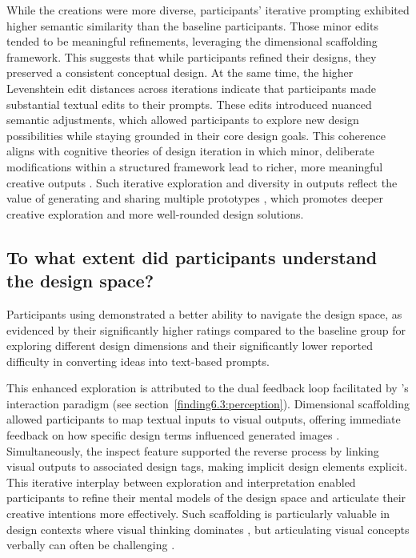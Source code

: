 While the \toolname{} creations were more diverse, participants’ iterative prompting exhibited higher semantic similarity than the baseline participants. Those minor edits tended to be meaningful refinements, leveraging the dimensional scaffolding framework. This suggests that while participants refined their designs, they preserved a consistent conceptual design. At the same time, the higher Levenshtein edit distances across iterations indicate that participants made substantial textual edits to their prompts. These edits introduced nuanced semantic adjustments, which allowed participants to explore new design possibilities while staying grounded in their core design goals. This coherence aligns with cognitive theories of design iteration in which minor, deliberate modifications within a structured framework lead to richer, more meaningful creative outputs \cite{karimi2019relating, davis2024fashioning}. Such iterative exploration and diversity in outputs reflect the value of generating and sharing multiple prototypes \cite{dow2011prototyping, hartmann2008design, kim2022mixplorer}, which promotes deeper creative exploration and more well-rounded design solutions.


\subsection{To what extent did \toolname{} participants understand the design space?}

Participants using \toolname{} demonstrated a better ability to navigate the design space, as evidenced by their significantly higher ratings compared to the baseline group for exploring different design dimensions and their significantly lower reported difficulty in converting ideas into text-based prompts.

This enhanced exploration is attributed to the dual feedback loop facilitated by \toolname{} ’s interaction paradigm (see section~\ref{finding6.3:perception}). Dimensional scaffolding allowed participants to map textual inputs to visual outputs, offering immediate feedback on how specific design terms influenced generated images \cite{yen2024give}. Simultaneously, the inspect feature supported the reverse process by linking visual outputs to associated design tags, making implicit design elements explicit. This iterative interplay between exploration and interpretation enabled participants to refine their mental models of the design space and articulate their creative intentions more effectively. Such scaffolding is particularly valuable in design contexts where visual thinking dominates \cite{xu2024jamplate,heyman2024supermind, dhillon2024shaping}, but articulating visual concepts verbally can often be challenging \cite{zamfirescu2023johnny}.

